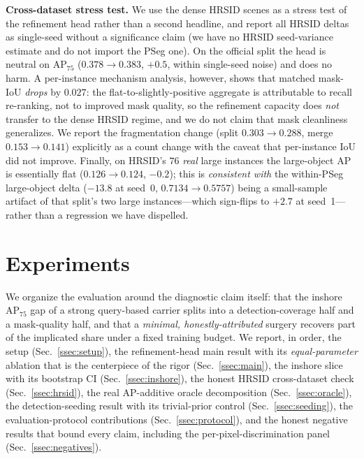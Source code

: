 \textbf{Cross-dataset stress test.} We use the dense HRSID scenes as a stress test of the refinement head rather than a second headline, and report all HRSID deltas as single-seed without a significance claim (we have no HRSID seed-variance estimate and do not import the PSeg one). On the official split the head is neutral on AP$_{75}$ ($0.378\!\rightarrow\!0.383$, $+0.5$, within single-seed noise) and does no harm. A per-instance mechanism analysis, however, shows that matched mask-IoU \emph{drops} by $0.027$: the flat-to-slightly-positive aggregate is attributable to recall re-ranking, not to improved mask quality, so the refinement capacity does \emph{not} transfer to the dense HRSID regime, and we do not claim that mask cleanliness generalizes. We report the fragmentation change (split $0.303\!\rightarrow\!0.288$, merge $0.153\!\rightarrow\!0.141$) explicitly as a count change with the caveat that per-instance IoU did not improve. Finally, on HRSID's $76$ \emph{real} large instances the large-object AP is essentially flat ($0.126\!\rightarrow\!0.124$, $-0.2$); this is \emph{consistent with} the within-PSeg large-object delta ($-13.8$ at seed~0, $0.7134\!\rightarrow\!0.5757$) being a small-sample artifact of that split's two large instances---which sign-flips to $+2.7$ at seed~1---rather than a regression we have dispelled.

\section{Experiments}
\label{sec:experiments}
We organize the evaluation around the diagnostic claim itself: that the inshore AP$_{75}$ gap of a strong query-based carrier splits into a detection-coverage half and a mask-quality half, and that a \emph{minimal, honestly-attributed} surgery recovers part of the implicated share under a fixed training budget. We report, in order, the setup (Sec.~\ref{ssec:setup}), the refinement-head main result with its \emph{equal-parameter} ablation that is the centerpiece of the rigor (Sec.~\ref{ssec:main}), the inshore slice with its bootstrap CI (Sec.~\ref{ssec:inshore}), the honest HRSID cross-dataset check (Sec.~\ref{ssec:hrsid}), the real AP-additive oracle decomposition (Sec.~\ref{ssec:oracle}), the detection-seeding result with its trivial-prior control (Sec.~\ref{ssec:seeding}), the evaluation-protocol contributions (Sec.~\ref{ssec:protocol}), and the honest negative results that bound every claim, including the per-pixel-discrimination panel (Sec.~\ref{ssec:negatives}).

